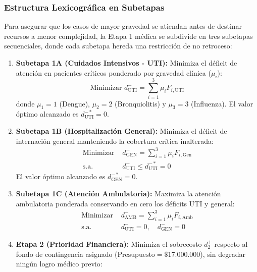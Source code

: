 \documentclass[conference]{IEEEtran}
\begin{document}
\subsubsection{Estructura Lexicográfica en Subetapas}
Para asegurar que los casos de mayor gravedad se atiendan antes de destinar recursos a menor complejidad, la Etapa 1 médica se subdivide en tres subetapas secuenciales, donde cada subetapa hereda una restricción de no retroceso:

\begin{enumerate}
    \item \textbf{Subetapa 1A (Cuidados Intensivos - UTI):} Minimiza el déficit de atención en pacientes críticos ponderado por gravedad clínica ($\mu_i$):
          \begin{equation}
              \text{Minimizar } d_{\text{UTI}}^- = \sum_{i=1}^{3} \mu_i F_{i,\text{UTI}}
          \end{equation}
          donde $\mu_1 = 1$ (Dengue), $\mu_2 = 2$ (Bronquiolitis) y $\mu_3 = 3$ (Influenza). El valor óptimo alcanzado es $d_{\text{UTI}}^{-*} = 0$.
    \item \textbf{Subetapa 1B (Hospitalización General):} Minimiza el déficit de internación general manteniendo la cobertura crítica inalterada:
          \begin{equation}
              \begin{aligned}
                  \text{Minimizar } & d_{\text{GEN}}^- = \sum_{i=1}^{3} \mu_i F_{i,\text{Gen}} \\
                  \text{s.a. }      & d_{\text{UTI}}^- \le d_{\text{UTI}}^{-*} = 0
              \end{aligned}
          \end{equation}
          El valor óptimo alcanzado es $d_{\text{GEN}}^{-*} = 0$.
    \item \textbf{Subetapa 1C (Atención Ambulatoria):} Maximiza la atención ambulatoria ponderada conservando en cero los déficits UTI y general:
          \begin{equation}
              \begin{aligned}
                  \text{Minimizar } & d_{\text{AMB}}^- = \sum_{i=1}^{3} \mu_i F_{i,\text{Amb}} \\
                  \text{s.a. }      & d_{\text{UTI}}^- = 0, \quad d_{\text{GEN}}^- = 0
              \end{aligned}
          \end{equation}
    \item \textbf{Etapa 2 (Prioridad Financiera):} Minimiza el sobrecosto $d_2^+$ respecto al fondo de contingencia asignado ($\text{Presupuesto} = \$17.000.000$), sin degradar ningún logro médico previo:

\end{enumerate}
\end{document}
